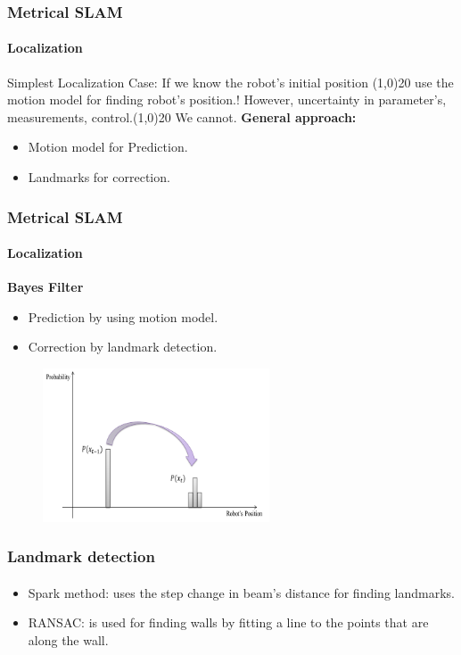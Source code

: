 \documentclass{beamer}
\begin{document}
	\begin{frame}
		\frametitle{Metrical SLAM}
		
		\framesubtitle{Localization}
		Simplest Localization Case: If we know the robot’s initial position \thicklines \vector(1,0){20} use the motion model for finding robot's position.! However, uncertainty in parameter’s, measurements, control.\thicklines \vector(1,0){20}  We cannot.
\textbf{General approach:}
		\begin{itemize}
			\item Motion model for Prediction.
			\item Landmarks for correction.
		\end{itemize}

	\end{frame}


	\begin{frame}
		\frametitle{Metrical SLAM}
		
		\framesubtitle{Localization}
		\textbf{Bayes Filter}
		\begin{itemize}
			\item Prediction by using motion model.
			\item Correction by landmark detection.
		\end{itemize}

		\begin{figure}
			\includegraphics[width=0.6\textwidth,height=0.5\textheight]{BayesFlt}
		\end{figure}

	\end{frame}




	\begin{frame}
		\frametitle{Landmark detection}
		
		\framesubtitle{}

		\begin{itemize}
			\item Spark method: uses the step change in beam’s distance for finding landmarks.
			\item RANSAC: is used for finding walls by fitting a line to the points that are along the wall.
		\end{itemize}

	\end{frame}
\end{document}
